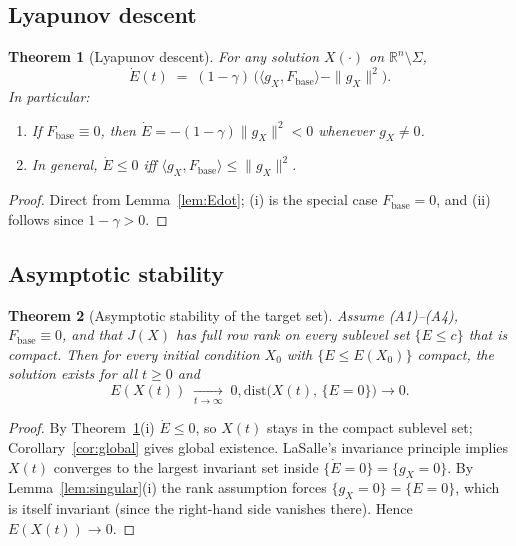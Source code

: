 \documentclass[11pt,oneside]{amsart}
\def\qquad{ }%
\theoremstyle{plain}
\newtheorem{theorem}{Theorem}[section]
\theoremstyle{definition}
\newcommand{\gX}{g_X}
\newcommand{\Fbase}{F_{\mathrm{base}}}
\newcommand{\R}{\mathbb{R}}
\begin{document}
\subsection{Lyapunov descent}

\begin{theorem}[Lyapunov descent]
\label{thm:descent}
For any solution $X(\cdot)$ on $\R^{n}\setminus\Sigma$,
\[
  \dot{E}(t) \;=\; (1-\gamma)\,\bigl(\langle \gX,\Fbase\rangle - \|\gX\|^{2}\bigr).
\]
In particular:
\begin{enumerate}[leftmargin=2em, label=\textup{(\roman*)}]
  \item If $\Fbase \equiv 0$, then
        $\dot{E} = -(1-\gamma)\|\gX\|^{2} < 0$ whenever $\gX\neq 0$.
  \item In general, $\dot{E} \le 0$ \emph{iff}
        $\langle \gX,\Fbase\rangle \le \|\gX\|^{2}$.
\end{enumerate}
\end{theorem}

\begin{proof}
Direct from Lemma~\ref{lem:Edot}; (i) is the special case $\Fbase=0$,
and (ii) follows since $1-\gamma>0$.
\end{proof}

\subsection{Asymptotic stability}

\begin{theorem}[Asymptotic stability of the target set]
\label{thm:asymptotic}
Assume \textup{(A1)--(A4)}, $\Fbase \equiv 0$, and that
$J(X)$ has full row rank on every sublevel set
$\{E\le c\}$ that is compact. Then for every initial condition $X_{0}$
with $\{E\le E(X_{0})\}$ compact, the solution exists for all
$t\ge 0$ and
\[
  E(X(t)) \;\xrightarrow[t\to\infty]{}\; 0,
  \qquad
  \mathrm{dist}\bigl(X(t),\,\{E=0\}\bigr)\to 0.
\]
\end{theorem}

\begin{proof}
By Theorem~\ref{thm:descent}(i) $\dot{E}\le 0$, so $X(t)$ stays in the
compact sublevel set; Corollary~\ref{cor:global} gives global existence.
LaSalle's invariance principle implies $X(t)$ converges to the largest
invariant set inside $\{\dot{E}=0\} = \{\gX = 0\}$. By
Lemma~\ref{lem:singular}(i) the rank assumption forces
$\{\gX=0\}=\{E=0\}$, which is itself invariant (since the right-hand
side vanishes there). Hence $E(X(t))\to 0$.
\end{proof}
\end{document}
